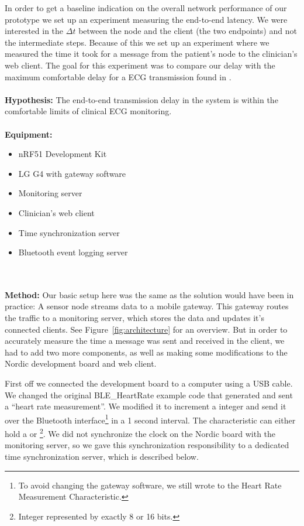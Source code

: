 In order to get a baseline indication on the overall network performance of our prototype we set up an experiment measuring the end-to-end latency. We were interested in the $\Delta t$ between the node and the client (the two endpoints) and not the intermediate steps. Because of this we set up an experiment where we measured the time it took for a message from the patient's node to the clinician's web client. The goal for this experiment was to compare our delay with the maximum comfortable delay for a ECG transmission found in \cite{Alesanco:2010kc}.
\\
\\
\noindent
\textbf{Hypothesis:} The end-to-end transmission delay in the system is within the comfortable limits of clinical ECG monitoring.
\\
\\
\noindent
\textbf{Equipment:} 
\begin{itemize}

  \item nRF51 Development Kit
  
  \item LG G4 with gateway software
  
  \item Monitoring server
  
  \item Clinician's web client 
  
  \item Time synchronization server

  \item Bluetooth event logging server
  
\end{itemize}
\\
\\
\noindent
\textbf{Method:} Our basic setup here was the same as the solution would have been in practice: A sensor node streams data to a mobile gateway. This gateway routes the traffic to a monitoring server, which stores the data and updates it's connected clients. See Figure~\ref{fig:architecture} for an overview. But in order to accurately measure the time a message was sent and received in the client, we had to add two more components, as well as making some modifications to the Nordic development board and web client.

First off we connected the development board to a computer using a USB cable. We changed the original BLE\_HeartRate example code that generated and sent a ``heart rate measurement''. We modified it to increment a  integer and send it over the Bluetooth interface\footnote{ To avoid changing the gateway software, we still wrote to the Heart Rate Measurement Characteristic.} in a 1 second interval. The characteristic can either hold a  or \footnote{ Integer represented by exactly 8 or 16 bits.}. We did not synchronize the clock on the Nordic board with the monitoring server, so we gave this synchronization responsibility to a dedicated time synchronization server, which is described below.

